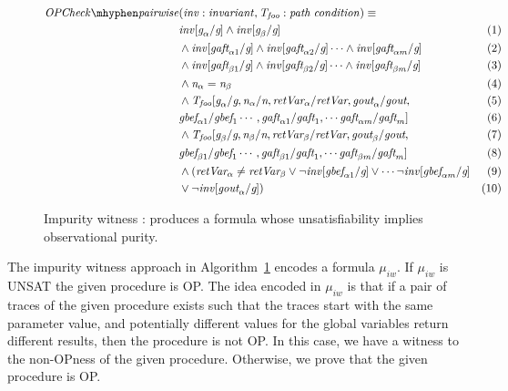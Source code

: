 \documentclass{llncs}
\newcommand{\foo}{\textit{foo}}
\newcommand{\inv}{\mathit{inv}}
\newcommand{\pathCondition}{\mathit{T_{\foo}}}
\newcommand{\OPCheckA}{\mathit{OPCheck \mhyphen pairwise}}
\newcommand{\mi}[1]{\mathit{#1}}
\newcommand{\retVar}{\textit{retVar}}
\newcommand{\n}{\textit{n}}
\newcommand{\g}{\textit{g}}
\newcommand{\gout}{\textit{gout}}
\newcommand{\gbef}{\textit{gbef}}
\newcommand{\gaft}{\textit{gaft}}
\newcommand{\formula}{\mu}
\begin{document}
\begin{figure}[htp]
  \begin{algorithm}[H]
    \begin{align*}
      \OPCheckA &\mi{(\inv : invariant,
        \pathCondition: path\; condition)} \equiv &\\
      &\inv[\g_\alpha/\g] \wedge \inv[\g_\beta/\g]  & (1)\\
      & \wedge \inv[\gaft_{\alpha1}/\g] \wedge
      \inv[\gaft_{\alpha2}/\g] \cdots \wedge \inv[\gaft_{\alpha m}/\g]
      & (2)\\
      & \wedge \inv[\gaft_{\beta1}/\g] \wedge \inv[\gaft_{\beta2}/\g]
      \cdots \wedge \inv[\gaft_{\beta m}/\g] & (3)\\
      &\wedge \n_\alpha = \n_\beta  & (4)\\
      &\wedge \pathCondition[\g_\alpha/\g, \n_\alpha/\n, \retVar_\alpha/\retVar,
        \gout_\alpha/\gout, & (5)\\
        &\gbef_{\alpha1}/\gbef_1 \cdots, \gaft_{\alpha 1}/\gaft_1, \cdots
        \gaft_{\alpha m}/\gaft_m]  & (6)\\
      &\wedge \pathCondition[\g_\beta/\g, \n_\beta/\n, \retVar_\beta/\retVar,
        \gout_\beta/\gout, & (7)\\
        &\gbef_{\beta1}/\gbef_1 \cdots, \gaft_{\beta 1}/\gaft_1, \cdots
        \gaft_{\beta m}/\gaft_m] & (8)\\
      &\wedge (\retVar_\alpha \neq \retVar_\beta \vee \neg\inv[\gbef_{\alpha1}/\g] \vee
       \cdots \neg\inv[\gbef_{\alpha m}/\g] & (9) \\
        &\vee \neg\inv[\gout_\alpha/\g])  & (10)\\
    \end{align*}
    \caption{Impurity witness : produces a formula whose unsatisfiability
    implies observational purity.}
    \label{algo:pairwiseOPcheckCombined}
  \end{algorithm}  
\end{figure}

The impurity witness approach in
Algorithm~\ref{algo:pairwiseOPcheckCombined} encodes a formula
$\formula_{iw}$. If $\formula_{iw}$ is UNSAT the given procedure is
OP. The idea encoded in $\formula_{iw}$ is that if a pair of traces of
the given procedure exists such that the traces start with the same
parameter value, and potentially different values for the global
variables return different results, then the procedure is not OP. In
this case, we have a witness to the non-OPness of the given
procedure. Otherwise, we prove that the given procedure is OP.
\end{document}
